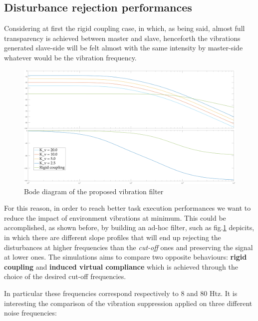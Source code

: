 \subsection{Disturbance rejection performances}

Considering at first the rigid coupling case, in which, as being said, almost
full transparency is achieved between master and slave, henceforth the vibrations
generated slave-side will be felt almost with the same intensity by master-side whatever would
be the vibration frequency.
\newline
\begin{figure}[h]
	\centering
	\includegraphics[width=0.7\linewidth]{Images/bodo}
	\caption{Bode diagram of the proposed vibration filter}
	\label{fig:bodo}
\end{figure}

For this reason, in order to reach better task execution performances we want to
reduce the impact of environment vibrations at minimum.
\newline
This could be accomplished, as shown before, by building an ad-hoc filter, such
as fig.\ref{fig:bodo} depicits, in which there are different slope profiles that
will end up rejecting the disturbances at higher frequencies than the
\textsl{cut-off} ones and preserving the signal at lower ones.
\newline
The simulations aims to compare two opposite behaviours: \textbf{rigid coupling}
and \textbf{induced virtual compliance} which is achieved through the choice of
the desired cut-off frequencies.
\newline

In particular these frequencies correspond respectively to 8 and 80 Htz.
It is interesting the comparison of the vibration suppression applied on three
different noise frequencies:

